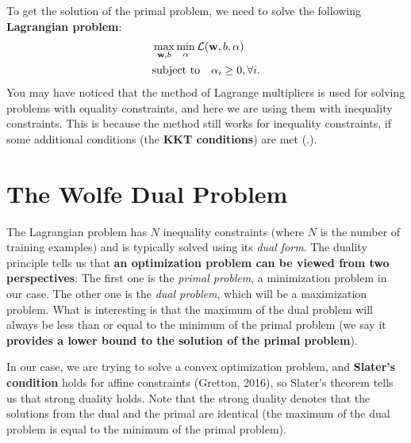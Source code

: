 To get the solution of the primal problem, we need to solve the following \textbf{Lagrangian problem}: 
\begin{align*}
	&\max_{\mathbf{w}, b}\min_\alpha \mathcal{L}({\mathbf{w}}, b, \alpha)\\
	&\textrm{subject to}\quad \alpha_i\geq 0, \forall i.
\end{align*}
You may have noticed that the method of Lagrange multipliers is used for solving problems with equality constraints, and here we are using them with inequality constraints. This is because the method still works for inequality constraints, if some additional conditions (the \textbf{KKT conditions}) are met (\cf {}.). 

\section{The Wolfe Dual Problem}
The Lagrangian problem has $N$ inequality constraints (where $N$ is the number of training examples) and is typically solved using its \textit{dual form}. The duality principle tells us that \textbf{an optimization problem can be viewed from two perspectives}: \Ni The first one is the \textit{primal problem}, a minimization problem in our case. \Nii The other one is the \textit{dual problem}, which will be a maximization problem. What is interesting is that the maximum of the dual problem will always be less than or equal to the minimum of the primal problem (we say it \textbf{provides a lower bound to the solution of the primal problem}). 

In our case, we are trying to solve a convex optimization problem, and \textbf{Slater's condition} holds for affine constraints (Gretton, 2016), so Slater’s theorem tells us that strong duality holds. Note that the strong duality denotes that the solutions from the dual and the primal are identical (the maximum of the dual problem is equal to the minimum of the primal problem). 

